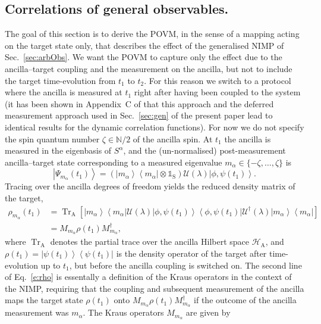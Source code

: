 \documentclass[epjST,numbook]{svjour}
\newcommand\NN{{\mathds{N}}}
\newcommand{\couple}{\mathscr{U}}
\newcommand{\ket}[1]{\left \vert #1 \right >}
\newcommand{\bra}[1]{\left < #1 \right \vert}
\DeclareMathOperator{\Tr}{{Tr}}
\begin{document}
\subsection{Correlations of general observables.}
The goal of this section is to derive the POVM, in the sense of a mapping acting on the target state only, that describes the effect of the generalised NIMP of Sec.~\ref{sec:arbObs}. We want the POVM to capture only the effect due to the ancilla--target coupling and the measurement on the ancilla, but not to include the target time-evolution from $t_1$ to $t_2$. For this reason we switch to a protocol where the ancilla is measured at $t_1$ right after having been coupled to the system (it has been shown in Appendix~C of \cite{Uhrich_etal} that this approach and the deferred measurement approach used in Sec.~\ref{sec:gen} of the present paper lead to identical results for the dynamic correlation functions). For now we do not specify the spin quantum number $\zeta\in\NN/2$ of the ancilla spin. At $t_1$ the ancilla is measured in the eigenbasis of $S^\alpha$, and the (un-normalised) post-measurement ancilla--target state corresponding to a measured eigenvalue $m_\alpha \in\{-\zeta,\ldots,\zeta\}$ is
\begin{equation}
	\ket{\Psi_{m_\alpha}(t_1)} = (\ket{m_\alpha}\!\bra{m_\alpha}\otimes\mathds{1}_\text{S}) \couple(\lambda)\ket{\phi,\psi(t_1)}.
\end{equation}
Tracing over the ancilla degrees of freedom yields the reduced density matrix of the target,
\begin{equation}\label{e:rho}
	\begin{split}
		\rho_{m_\alpha}(t_1)&= \Tr_{ \text{A}}\left[\ket{m_\alpha}\!\bra{m_\alpha}\mathscr{U}(\lambda)\ket{\phi,\psi(t_1)}\!\bra{\phi,\psi(t_1)} \mathscr{U}^\dagger(\lambda)  \ket{m_\alpha}\!\bra{m_\alpha} \right] \\
		&=M_{m_\alpha} \rho(t_1)M^\dagger_{m_\alpha},  %
	\end{split}
\end{equation}
where $\Tr_{ \text{A}}$ denotes the partial trace over the ancilla Hilbert space $\mathscr{H}_\text{A}$, and $\rho(t_1)=\ket{\psi(t_1)}\!\bra{\psi(t_1)}$ is the density operator of the target after time-evolution up to $t_1$, but before the ancilla coupling is switched on. The second line of Eq.~\eqref{e:rho} is essentally a definition of the Kraus operators in the context of the NIMP, requiring that the coupling and subsequent measurement of the ancilla maps the target state $\rho(t_1)$ onto $M_{m_\alpha} \rho(t_1)M^\dagger_{m_\alpha}$ if the outcome of the ancilla measurement was $m_\alpha$. The Kraus operators $M_{m_\alpha}$ are given by
\end{document}
